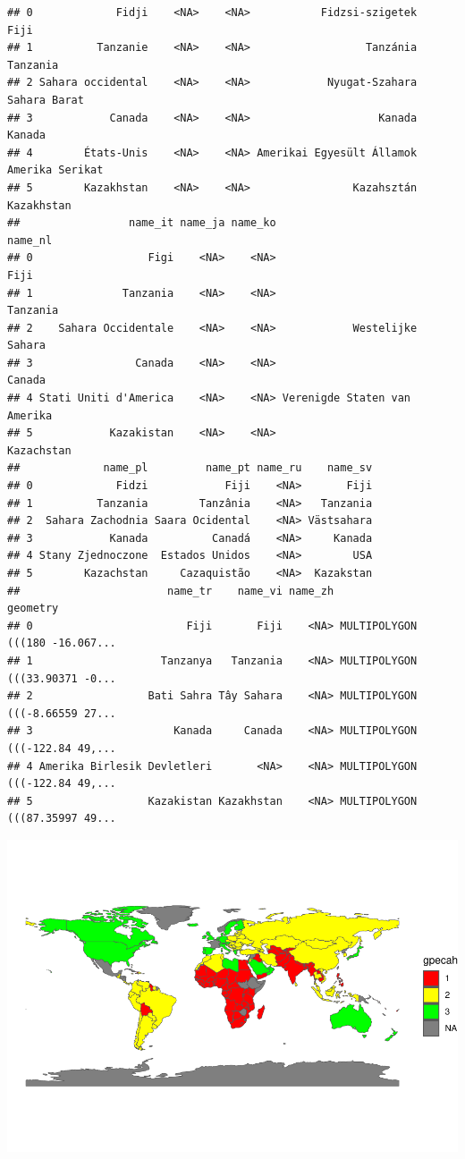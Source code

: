 \documentclass[
]{article}
\begin{document}
\begin{verbatim}
## 0             Fidji    <NA>    <NA>           Fidzsi-szigetek            Fiji
## 1          Tanzanie    <NA>    <NA>                  Tanzánia        Tanzania
## 2 Sahara occidental    <NA>    <NA>            Nyugat-Szahara    Sahara Barat
## 3            Canada    <NA>    <NA>                    Kanada          Kanada
## 4        États-Unis    <NA>    <NA> Amerikai Egyesült Államok Amerika Serikat
## 5        Kazakhstan    <NA>    <NA>                Kazahsztán      Kazakhstan
##                 name_it name_ja name_ko                      name_nl
## 0                  Figi    <NA>    <NA>                         Fiji
## 1              Tanzania    <NA>    <NA>                     Tanzania
## 2    Sahara Occidentale    <NA>    <NA>            Westelijke Sahara
## 3                Canada    <NA>    <NA>                       Canada
## 4 Stati Uniti d'America    <NA>    <NA> Verenigde Staten van Amerika
## 5            Kazakistan    <NA>    <NA>                   Kazachstan
##             name_pl         name_pt name_ru    name_sv
## 0             Fidzi            Fiji    <NA>       Fiji
## 1          Tanzania        Tanzânia    <NA>   Tanzania
## 2  Sahara Zachodnia Saara Ocidental    <NA> Västsahara
## 3            Kanada          Canadá    <NA>     Kanada
## 4 Stany Zjednoczone  Estados Unidos    <NA>        USA
## 5        Kazachstan     Cazaquistão    <NA>  Kazakstan
##                       name_tr    name_vi name_zh                       geometry
## 0                        Fiji       Fiji    <NA> MULTIPOLYGON (((180 -16.067...
## 1                    Tanzanya   Tanzania    <NA> MULTIPOLYGON (((33.90371 -0...
## 2                  Bati Sahra Tây Sahara    <NA> MULTIPOLYGON (((-8.66559 27...
## 3                      Kanada     Canada    <NA> MULTIPOLYGON (((-122.84 49,...
## 4 Amerika Birlesik Devletleri       <NA>    <NA> MULTIPOLYGON (((-122.84 49,...
## 5                  Kazakistan Kazakhstan    <NA> MULTIPOLYGON (((87.35997 49...
\end{verbatim}

\includegraphics{Projet_files/figure-latex/unnamed-chunk-29-1.pdf}
\end{document}

